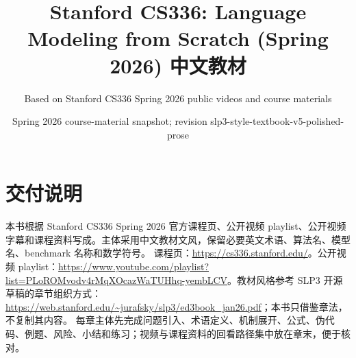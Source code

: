 \documentclass[a4paper]{article}
\title{Stanford CS336: Language Modeling from Scratch (Spring 2026) 中文教材}
\author{Based on Stanford CS336 Spring 2026 public videos and course materials}
\date{Spring 2026 course-material snapshot; revision slp3-style-textbook-v5-polished-prose}
\begin{document}
\maketitle
\tableofcontents
\newpage
\section*{交付说明}
本书根据 Stanford CS336 Spring 2026 官方课程页、公开视频 playlist、公开视频字幕和课程资料写成。主体采用中文教材文风，保留必要英文术语、算法名、模型名、benchmark 名称和数学符号。
课程页：\url{https://cs336.stanford.edu/}。公开视频 playlist：\url{https://www.youtube.com/playlist?list=PLoROMvodv4rMqXOcazWaTUHhq-yembLCV}。教材风格参考 SLP3 开源草稿的章节组织方式：\url{https://web.stanford.edu/~jurafsky/slp3/ed3book_jan26.pdf}；本书只借鉴章法，不复制其内容。
每章主体先完成问题引入、术语定义、机制展开、公式、伪代码、例题、风险、小结和练习；视频与课程资料的回看路径集中放在章末，便于核对。
\end{document}
